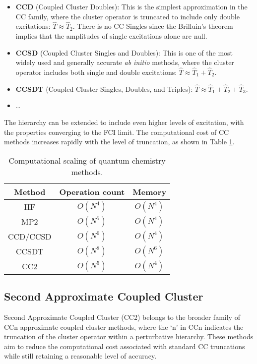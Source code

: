 \begin{itemize}
    \item \textbf{CCD} (Coupled Cluster Doubles): This is the simplest approximation in the CC family, where the cluster operator is truncated to include only double excitations: $\hat{T} \approx \hat{T}_2$. There is no CC Singles since the Brilluin's theorem implies that the amplitudes of single excitations alone are null. 
    \item \textbf{CCSD} (Coupled Cluster Singles and Doubles): This is one of the most widely used and generally accurate \textit{ab initio} methods, where the cluster operator includes both single and double excitations: $\hat{T} \approx \hat{T}_1 + \hat{T}_2$.
    \item \textbf{CCSDT} (Coupled Cluster Singles, Doubles, and Triples): $\hat{T} \approx \hat{T}_1 + \hat{T}_2 + \hat{T}_3$.
    \item \ldots
\end{itemize}
The hierarchy can be extended to include even higher levels of excitation,  with the properties converging to the FCI limit. The computational cost of CC methods increases rapidly with the level of truncation, as shown in Table \ref{tab:qc_scaling}.
\begin{table}[h!]
    \centering
    \begin{tabular}{ccc}
        Method & Operation count & Memory \\
        \hline
        HF & $O(N^4)$ & $O(N^4)$ \\
        MP2 & $O(N^5)$ & $O(N^4)$ \\
        CCD/CCSD & $O(N^6)$ & $O(N^4)$ \\
        CCSDT & $O(N^8)$ & $O(N^6)$ \\
        CC2 & $O(N^{5})$ & $O(N^4)$ \\
    \end{tabular}
    \caption{Computational scaling of quantum chemistry methods.}
    \label{tab:qc_scaling}
\end{table}

\subsection{Second Approximate Coupled Cluster}\label{sec:CC2Theory}
Second Approximate Coupled Cluster (CC2) belongs to the broader family of CCn approximate coupled cluster methods, where the `n' in CCn indicates the truncation of the cluster operator within a perturbative hierarchy. These methods aim to reduce the computational cost associated with standard CC truncations while still retaining a reasonable level of accuracy.\\

